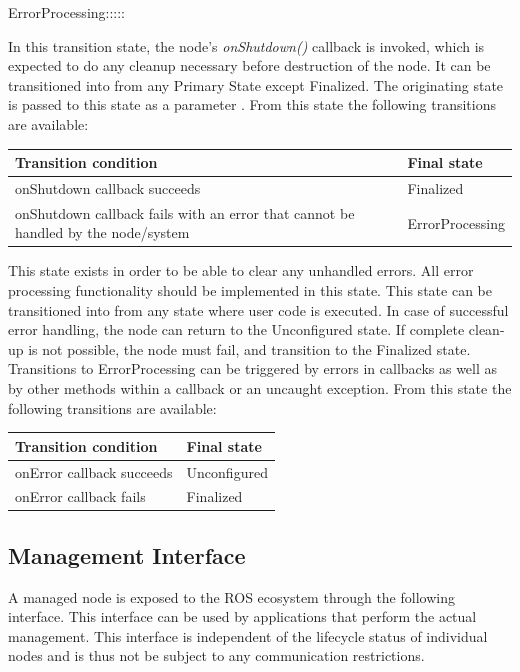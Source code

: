 \begin{labeling}{ErrorProcessing:::::}
		\item[\textbf{ShuttingDown}] In this transition state, the node's \textit{onShutdown()} callback is invoked, which is expected to do any cleanup necessary before destruction of the node. It can be transitioned into from any Primary State except Finalized. The originating state is passed to this state as a parameter .
		From this state the following transitions are available:
		\begin{table}[H]
			\flushright
			\label{tab:Valid transitions}
			\begin{tabular}{|p{8.5cm}|p{3cm}|}
				\toprule
				Transition condition & Final state\\
				\midrule
				onShutdown callback succeeds & Finalized \\
				onShutdown callback fails with an error that cannot be handled by the node/system  & ErrorProcessing \\
				\bottomrule
			\end{tabular}
		\end{table}

		\item[\textbf{ErrorProcessing}] This state exists in order to be able to clear any unhandled errors.  All error processing functionality should be implemented in this state. This state can be transitioned into from any state where user code is executed. In case of successful error handling, the node can return to the Unconfigured state. If complete clean-up is not possible, the node must fail, and transition to the Finalized state. Transitions to ErrorProcessing can be triggered by errors in callbacks as well as by other methods within a callback or an uncaught exception.
		From this state the following transitions are available:
		\begin{table}[H]
			\flushright
			\label{tab:Valid transitions}
			\begin{tabular}{|p{8.5cm}|p{3cm}|}
				\toprule
				Transition condition & Final state\\
				\midrule
				onError callback succeeds & Unconfigured \\
				onError callback fails & Finalized \\
				\bottomrule
			\end{tabular}
		\end{table}

	\end{labeling}

	\subsection{Management Interface}
	A managed node is exposed to the ROS ecosystem through the following interface. This interface can be used by applications that perform the actual management. This interface is independent of the lifecycle status of individual nodes and is thus not be subject to any communication restrictions.\\

